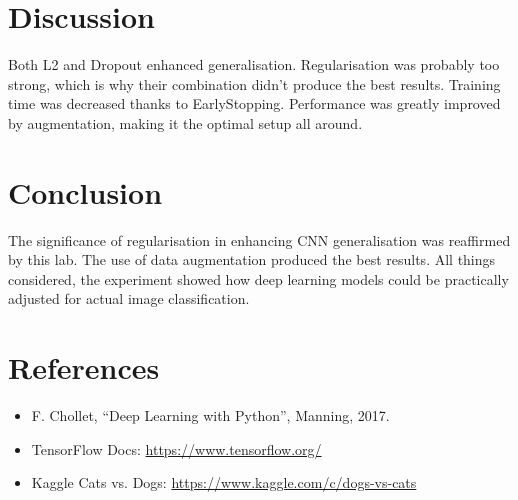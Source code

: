 \documentclass{article}
\begin{document}
\section{Discussion}
Both L2 and Dropout enhanced generalisation. Regularisation was probably too strong, which is why their combination didn't produce the best results. Training time was decreased thanks to EarlyStopping. Performance was greatly improved by augmentation, making it the optimal setup all around.

\section{Conclusion}
The significance of regularisation in enhancing CNN generalisation was reaffirmed by this lab. The use of data augmentation produced the best results. All things considered, the experiment showed how deep learning models could be practically adjusted for actual image classification.

\section*{References}
\begin{itemize}
    \item F. Chollet, “Deep Learning with Python”, Manning, 2017.
    \item TensorFlow Docs: \url{https://www.tensorflow.org/}
    \item Kaggle Cats vs. Dogs: \url{https://www.kaggle.com/c/dogs-vs-cats}
\end{itemize}
\end{document}
